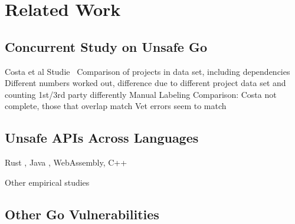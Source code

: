 
\chapter{Related Work}\label{ch:related-work}



\section{Concurrent Study on Unsafe Go}\label{sec:related-work:concurrent-study}

Costa et al Studie~\cite{costa2020}
Comparison of projects in data set, including dependencies
Different numbers worked out, difference due to different project data set and counting 1st/3rd party differently
Manual Labeling Comparison: Costa not complete, those that overlap match
Vet errors seem to match







\section{Unsafe APIs Across Languages}\label{sec:related-work:unsafe-across-languages}

Rust \cite{evans2020, qin2020}, Java \cite{huang2019, mastrangelo2015, wickert2019}, WebAssembly, C++ \cite{alnaeli2017, larochelle2001}

Other empirical studies \cite{difranco2017, lu2013, chou2001, leesatapornwongsa2016, lauinger2017, jin2012, gunawi2014, gu2015}



\section{Other Go Vulnerabilities}\label{sec:related-work:other-go-vulnerabilities}

